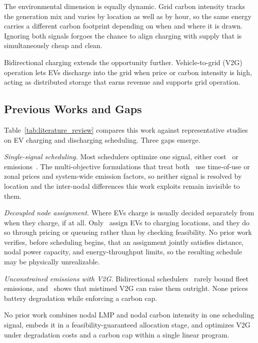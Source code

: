 \documentclass[sustainability,article,submit,moreauthors,pdftex]{Definitions/mdpi}
\begin{document}
The environmental dimension is equally dynamic. Grid carbon intensity tracks the generation mix and varies by location as well as by hour, so the same energy carries a different carbon footprint depending on when and where it is drawn. Ignoring both signals forgoes the chance to align charging with supply that is simultaneously cheap and clean.

Bidirectional charging extends the opportunity further. Vehicle-to-grid (V2G) operation lets EVs discharge into the grid when price or carbon intensity is high, acting as distributed storage that earns revenue and supports grid operation.

\subsection{Previous Works and Gaps}

Table~\ref{tab:literature_review} compares this work against representative
studies on EV charging and discharging scheduling. Three gaps emerge.

\textit{Single-signal scheduling.} Most schedulers optimize one signal,
either cost~\cite{sortomme2011, sundstrom2012, gan2013, li2014dlmp,
huang2015dlmp, sarker2016} or emissions~\cite{hoehne2016, xu2020ghg,
cheng2022carbon}. The multi-objective formulations that treat
both~\cite{das2020, aurangzeb2025, alikhani2025, ambrosino2025} use
time-of-use or zonal prices and system-wide emission factors, so neither
signal is resolved by location and the inter-nodal differences this work
exploits remain invisible to them.

\textit{Decoupled node assignment.} Where EVs charge is usually decided
separately from when they charge, if at all. Only~\cite{moradipari2020,
arias2023lmp} assign EVs to charging locations, and they do so through
pricing or queueing rather than by checking feasibility. No prior work
verifies, before scheduling begins, that an assignment jointly satisfies
distance, nodal power capacity, and energy-throughput limits, so the
resulting schedule may be physically unrealizable.

\textit{Unconstrained emissions with V2G.} Bidirectional
schedulers~\cite{sarker2016, hoehne2016, das2020, aurangzeb2025,
alikhani2025} rarely bound fleet emissions, and~\cite{hoehne2016} shows
that mistimed V2G can raise them outright. None prices battery
degradation while enforcing a carbon cap.

No prior work combines nodal LMP and nodal carbon intensity in one
scheduling signal, embeds it in a feasibility-guaranteed allocation
stage, and optimizes V2G under degradation costs and a carbon cap within
a single linear program.
\end{document}
